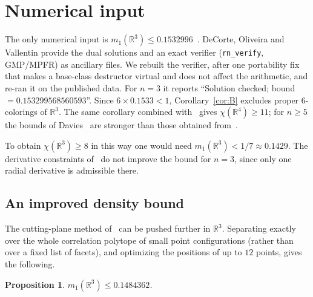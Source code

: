 \documentclass[11pt]{amsart}
\newtheorem{proposition}[theorem]{Proposition}
\theoremstyle{definition}
\newcommand{\R}{\mathbb{R}}
\begin{document}
\section{Numerical input}\label{sec:numerics}

The only numerical input is $m_1(\R^3)\le0.1532996$~\cite[Table 2]{DOV}. DeCorte, Oliveira and Vallentin provide the dual solutions and an exact verifier (\texttt{rn\_verify}, GMP/MPFR) as ancillary files. We rebuilt the verifier, after one portability fix that makes a base-class destructor virtual and does not affect the arithmetic, and re-ran it on the published data. For $n=3$ it reports ``Solution checked; bound $=0.153299568560593$''. Since $6\times0.1533<1$, Corollary~\ref{cor:B} excludes proper $6$-colorings of $\R^3$. The same corollary combined with~\cite[Table 2]{DOV} gives $\chi(\R^4)\ge11$; for $n\ge5$ the bounds of Davies~\cite{Davies} are stronger than those obtained from~\cite{DOV,BPT}.

To obtain $\chi(\R^3)\ge8$ in this way one would need $m_1(\R^3)<1/7\approx0.1429$. The derivative constraints of~\cite[Section 9]{Davies} do not improve the bound for $n=3$, since only one radial derivative is admissible there.

\subsection*{An improved density bound}
The cutting-plane method of~\cite{DOV} can be pushed further in $\R^3$. Separating exactly over the whole correlation polytope of small point configurations (rather than over a fixed list of facets), and optimizing the positions of up to $12$ points, gives the following.

\begin{proposition}\label{prop:m1}
$m_1(\R^3)\le0.1484362$.
\end{proposition}
\end{document}

